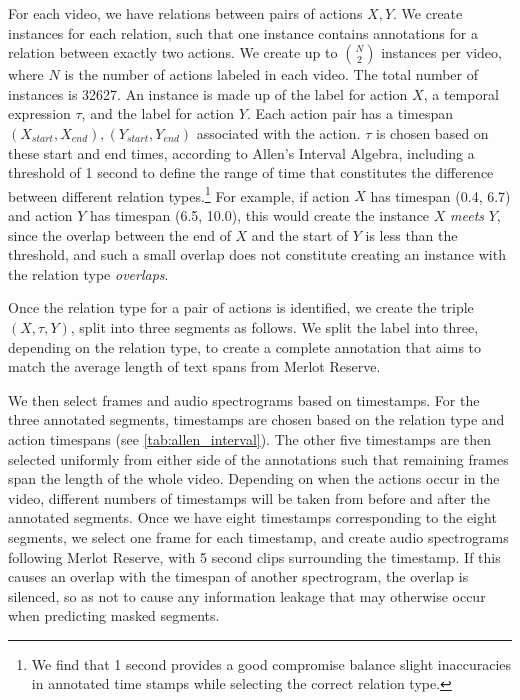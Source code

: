For each video, we have relations between pairs of actions $X, Y$.  We create
instances for each relation, such that one instance contains annotations for a
relation between exactly two actions. We create up to $\binom{N}{2}$ instances
per video, where $N$ is the number of actions labeled in each video. The total
number of instances is 32627. An instance is made up of the label for action
$X$, a temporal expression $\tau$, and the label for action $Y$. Each action
pair has a timespan $(X_{start}, X_{end}), (Y_{start}, Y_{end})$ associated
with the action. $\tau$ is chosen based on these start and end times, according
to Allen's Interval Algebra, including a threshold of 1 second to define the
range of time that constitutes the difference between different relation types.\footnote{We find that 1 second provides a good compromise balance slight
inaccuracies in annotated time stamps while selecting the correct relation
type.} 
For example, if action $X$ has timespan (0.4, 6.7) and action $Y$ has
timespan (6.5, 10.0), this would create the instance $X$ \textit{meets} $Y$,
since the overlap between the end of $X$ and the start of $Y$ is less than the
threshold, and such a small overlap does not constitute creating an instance
with the relation type \textit{overlaps}.

Once the relation type for a pair of actions is identified, we create the
triple $(X,\tau,Y)$, split into three segments as follows. We split the label
into three, depending on the relation type, to create a complete annotation
that aims to match the average length of text spans from Merlot Reserve.


We then select frames and audio spectrograms based on timestamps. For the three
annotated segments, timestamps are chosen based on the relation type and action
timespans (see \cref{tab:allen_interval}). The other five timestamps are then
selected uniformly from either side of the annotations such that remaining
frames span the length of the whole video. Depending on when the actions occur
in the video, different numbers of timestamps will be taken from before and
after the annotated segments. Once we have eight timestamps corresponding to
the eight segments, we select one frame for each timestamp, and create audio
spectrograms following Merlot Reserve, with 5 second clips surrounding the
timestamp. If this causes an overlap with the timespan of another spectrogram,
the overlap is silenced, so as not to cause any information leakage that may
otherwise occur when predicting masked segments.

